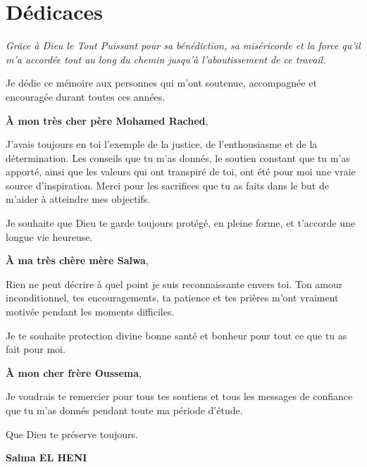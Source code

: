 \chapter*{Dédicaces}

\begin{center}
\textit{
Grâce à Dieu le Tout Puissant pour sa bénédiction, sa miséricorde et la force qu'il m'a accordée tout au long du chemin jusqu'à l'aboutissement de ce travail.
}
\end{center}

\vspace{0.5cm}

Je dédie ce mémoire aux personnes qui m'ont soutenue, accompagnée et encouragée durant toutes ces années.

\textbf{À mon très cher père Mohamed Rached},

J'avais toujours en toi l'exemple de la justice, de l'enthousiasme et de la détermination. Les conseils que tu m'as donnés, le soutien constant que tu m'as apporté, ainsi que les valeurs qui ont transpiré de toi, ont été pour moi une vraie source d'inspiration. Merci pour les sacrifices que tu as faits dans le but de m'aider à atteindre mes objectifs.

Je souhaite que Dieu te garde toujours protégé, en pleine forme, et t'accorde une longue vie heureuse.

\textbf{À ma très chère mère Salwa},

Rien ne peut décrire à quel point je suis reconnaissante envers toi. Ton amour inconditionnel, tes encouragements, ta patience et tes prières m'ont vraiment motivée pendant les moments difficiles.

Je te souhaite protection divine bonne santé et bonheur pour tout ce que tu as fait pour moi.

\textbf{À mon cher frère Oussema},

Je voudrais te remercier pour tous tes soutiens et tous les messages de confiance que tu m'as donnés pendant toute ma période d'étude.

Que Dieu te préserve toujours.

\begin{flushright}
\textbf{Salma EL HENI}
\end{flushright}